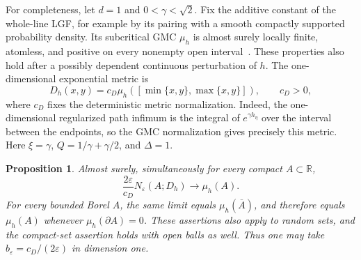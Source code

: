 \documentclass[11pt,letterpaper]{article}
\newcommand{\R}{\mathbb R}
\newcommand{\eps}{\varepsilon}
\newtheorem{proposition}[theorem]{Proposition}
\theoremstyle{definition}
\theoremstyle{remark}
\numberwithin{equation}{section}
\begin{document}
For completeness, let $d=1$ and $0<\gamma<\sqrt2$. Fix the additive constant of the whole-line LGF, for example by its pairing with a smooth compactly supported probability density. Its subcritical GMC $\mu_h$ is almost surely locally finite, atomless, and positive on every nonempty open interval~\cite{RV,Shamov}. These properties also hold after a possibly dependent continuous perturbation of $h$. The one-dimensional exponential metric is
\begin{equation*}
 D_h(x,y)=c_D\mu_h([\min\{x,y\},\max\{x,y\}]),
 \qquad c_D>0,
\end{equation*}
where $c_D$ fixes the deterministic metric normalization. Indeed, the one-dimensional regularized path infimum is the integral of $e^{\gamma h_\eta}$ over the interval between the endpoints, so the GMC normalization gives precisely this metric. Here $\xi=\gamma$, $Q=1/\gamma+\gamma/2$, and $\Delta=1$.

\begin{proposition}\label{prop:one-dimensional}
Almost surely, simultaneously for every compact $A\subset\R$,
\begin{equation*}
 \frac{2\eps}{c_D}N_\eps(A;D_h)\longrightarrow\mu_h(A).
\end{equation*}
For every bounded Borel $A$, the same limit equals $\mu_h(\overline A)$, and therefore equals $\mu_h(A)$ whenever $\mu_h(\partial A)=0$. These assertions also apply to random sets, and the compact-set assertion holds with open balls as well. Thus one may take $b_\eps=c_D/(2\eps)$ in dimension one.
\end{proposition}
\end{document}
